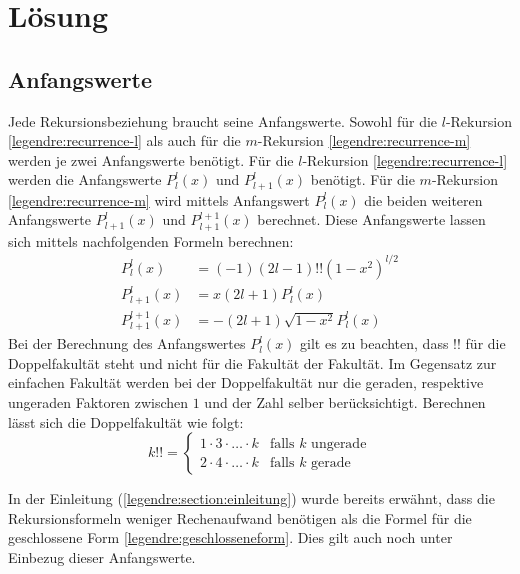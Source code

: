 %
%
%
\section{Lösung
\label{legendre:section:loesung}}
\subsection{Anfangswerte
\label{legendre:subsection:anfangswerte}}
Jede Rekursionsbeziehung braucht seine Anfangswerte.
Sowohl für die $l$-Rekursion \eqref{legendre:recurrence-l} als auch für die $m$-Rekursion \eqref{legendre:recurrence-m} werden je zwei Anfangswerte benötigt.
Für die $l$-Rekursion \eqref{legendre:recurrence-l} werden die Anfangswerte $P^{l}_{l}(x)$ und $P^{l}_{l+1}(x)$ benötigt.
Für die $m$-Rekursion \eqref{legendre:recurrence-m} wird mittels Anfangswert $P^{l}_{l}(x)$ die beiden weiteren Anfangswerte $P^{l}_{l+1}(x)$ und $P^{l+1}_{l+1}(x)$ berechnet.
Diese Anfangswerte lassen sich mittels nachfolgenden Formeln berechnen:
\begin{equation}
\begin{aligned}
P^{l}_{l}(x)
&=(-1)(2l-1)!!(1-x^2)^{l/2}\\
P^{l}_{l+1}(x)
&=x(2l+1)P^{l}_{l}(x)\\
P^{l+1}_{l+1}(x)
&=-(2l+1)\sqrt{1-x^2}P^{l}_{l}(x)
\label{legendre:anfangswerte}
\end{aligned}
\end{equation}
Bei der Berechnung des Anfangswertes $P^{l}_{l}(x)$ gilt es zu beachten, dass $!!$ für die Doppelfakultät steht und nicht für die Fakultät der Fakultät.
Im Gegensatz zur einfachen Fakultät werden bei der Doppelfakultät nur die geraden, respektive ungeraden Faktoren zwischen $1$ und der Zahl selber berücksichtigt.
Berechnen lässt sich die Doppelfakultät wie folgt:
\begin{equation}
k!! = 
\begin{cases}
1 \cdot 3 \cdot \ldots \cdot k & \text{falls $k$ ungerade}\\
2 \cdot 4 \cdot \ldots \cdot k & \text{falls $k$ gerade}
\end{cases}
\label{legendre:doppelfakultaet}
\end{equation}

In der Einleitung (\ref{legendre:section:einleitung}) wurde bereits erwähnt, dass die Rekursionsformeln weniger Rechenaufwand benötigen als die Formel für die geschlossene Form \eqref{legendre:geschlosseneform}.
Dies gilt auch noch unter Einbezug dieser Anfangswerte.

